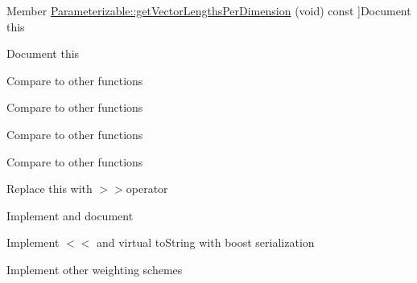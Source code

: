 \begin{DoxyRefList}
\hypertarget{todo__todo000018}{}%
Member \hyperlink{classDmpBbo_1_1Parameterizable_a410ef532c4861b8d50c35508fa114484}{Parameterizable\+:\+:get\+Vector\+Lengths\+Per\+Dimension} (void) const ]Document this  
\item[\label{todo__todo000017}%
\hypertarget{todo__todo000017}{}%
Member \hyperlink{classDmpBbo_1_1Parameterizable_a77089aa6cc3b95dd0a1c17de7bc033b9}{Parameterizable\+:\+:set\+Vector\+Lengths\+Per\+Dimension} (const Eigen\+::\+Vector\+Xi \&lengths\+\_\+per\+\_\+dimension)]Document this  
\item[\label{todo__todo000002}%
\hypertarget{todo__todo000002}{}%
Member \hyperlink{classDmpBbo_1_1TaskSolver_aea5c8e55f828886dae52bacf466dc707}{Task\+Solver\+:\+:perform\+Rollouts} (const Eigen\+::\+Matrix\+Xd \&samples, Eigen\+::\+Matrix\+Xd \&cost\+\_\+vars) const ]Compare to other functions  
\item[\label{todo__todo000003}%
\hypertarget{todo__todo000003}{}%
Member \hyperlink{classDmpBbo_1_1TaskSolver_a36d1f440face2e087122666173020bb1}{Task\+Solver\+:\+:perform\+Rollouts} (const Eigen\+::\+Matrix\+Xd \&samples, const Eigen\+::\+Matrix\+Xd \&task\+\_\+parameters, Eigen\+::\+Matrix\+Xd \&cost\+\_\+vars) const =0]Compare to other functions  
\item[\label{todo__todo000009}%
\hypertarget{todo__todo000009}{}%
Member \hyperlink{classDmpBbo_1_1TaskSolverParallel_ab6bf8d682d404ed901d8947b7ff86f3e}{Task\+Solver\+Parallel\+:\+:perform\+Rollouts} (const std\+::vector$<$ Eigen\+::\+Matrix\+Xd $>$ \&samples\+\_\+vec, Eigen\+::\+Matrix\+Xd \&cost\+\_\+vars) const ]Compare to other functions  
\item[\label{todo__todo000010}%
\hypertarget{todo__todo000010}{}%
Member \hyperlink{classDmpBbo_1_1TaskSolverParallel_aa91bb4c2ddec55ee7c594cd639094d36}{Task\+Solver\+Parallel\+:\+:perform\+Rollouts} (const std\+::vector$<$ Eigen\+::\+Matrix\+Xd $>$ \&samples\+\_\+vec, const Eigen\+::\+Matrix\+Xd \&task\+\_\+parameters, Eigen\+::\+Matrix\+Xd \&cost\+\_\+vars) const =0]Compare to other functions  
\item[\label{todo__todo000008}%
\hypertarget{todo__todo000008}{}%
Member \hyperlink{classDmpBbo_1_1Trajectory_aac7e666c7fa5ea89ec1ba884e0a118a0}{Trajectory\+:\+:read\+From\+File} (std\+::string filename, int n\+\_\+dims\+\_\+misc=0)]Replace this with $>$$>$operator  
\item[\label{todo__todo000019}%
\hypertarget{todo__todo000019}{}%
Member \hyperlink{classDmpBbo_1_1UnifiedModel_a812ed8332b71789b6d8fd9355ff94fa7}{Unified\+Model\+:\+:set\+\_\+slopes\+\_\+as\+\_\+angles} (bool slopes\+\_\+as\+\_\+angles)]Implement and document  
\item[\label{todo__todo000004}%
\hypertarget{todo__todo000004}{}%
Class \hyperlink{classDmpBbo_1_1Updater}{Updater} ]Implement $<$$<$ and virtual to\+String with boost serialization  
\item[\label{todo__todo000005}%
\hypertarget{todo__todo000005}{}%
Member \hyperlink{classDmpBbo_1_1UpdaterMean_a67bb3ad0e7d34b11aa5453adc462f9cc}{Updater\+Mean\+:\+:costs\+To\+Weights} (const Eigen\+::\+Vector\+Xd \&costs, std\+::string weighting\+\_\+method, double eliteness, Eigen\+::\+Vector\+Xd \&weights) const ]Implement other weighting schemes 
\end{DoxyRefList}